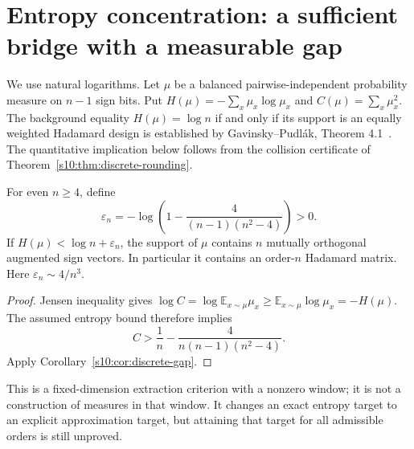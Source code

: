 \section{Entropy concentration: a sufficient bridge with a measurable gap}
\label{s07:sec:entropy-bridge}
We use natural logarithms. Let $\mu$ be a balanced pairwise-independent
probability measure on $n-1$ sign bits. Put
$H(\mu)=-\sum_x\mu_x\log\mu_x$ and $C(\mu)=\sum_x\mu_x^2$.
The background equality $H(\mu)=\log n$ if and only if its support
is an equally weighted Hadamard design is established by
Gavinsky--Pudl\'ak, Theorem 4.1~\cite{s06:GP}. The quantitative implication below follows from the collision certificate of Theorem~\ref{s10:thm:discrete-rounding}.

\begin{corollary}\label{s07:cor:entropy-window}
For even $n\ge4$, define
\[
 \varepsilon_n=-\log\left(1-\frac4{(n-1)(n^2-4)}\right)>0.
\]
If $H(\mu)<\log n+\varepsilon_n$, the support of $\mu$ contains
$n$ mutually orthogonal augmented sign vectors. In particular it
contains an order-$n$ Hadamard matrix. Here
$\varepsilon_n\sim4/n^3$.
\end{corollary}
\begin{proof}
Jensen inequality gives
$\log C=\log\mathbb E_{x\sim\mu}\mu_x
\ge\mathbb E_{x\sim\mu}\log\mu_x=-H(\mu)$.
The assumed entropy bound therefore implies
\[
 C>\frac1n-\frac4{n(n-1)(n^2-4)}.
\]
Apply Corollary~\ref{s10:cor:discrete-gap}.
\end{proof}
This is a fixed-dimension extraction criterion with a nonzero window;
it is not a construction of measures in that window. It changes an
exact entropy target to an explicit approximation target, but attaining
that target for all admissible orders is still unproved.

